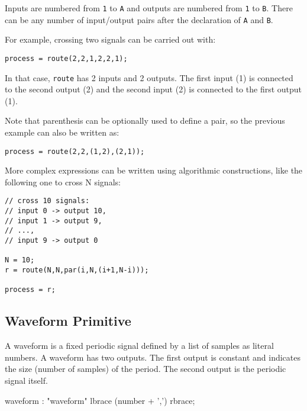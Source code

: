 Inputs are numbered from \lstinline'1' to \lstinline'A' and outputs are numbered from \lstinline'1' to \lstinline'B'. There can be any number of input/output pairs after the declaration of \lstinline'A' and \lstinline'B'.

For example, crossing two signals can be carried out with:

\begin{lstlisting}
process = route(2,2,1,2,2,1);
\end{lstlisting}

In that case, \lstinline'route' has 2 inputs and 2 outputs. The first input (1) is connected to the second output (2) and the second input (2) is connected to the first output (1).

Note that parenthesis can be optionally used to define a pair, so the previous example can also be written as:

\begin{lstlisting}
process = route(2,2,(1,2),(2,1));
\end{lstlisting}

More complex expressions can be written using algorithmic constructions, like the following one to cross N signals:

\begin{lstlisting}
// cross 10 signals: 
// input 0 -> output 10, 
// input 1 -> output 9, 
// ..., 
// input 9 -> output 0

N = 10;
r = route(N,N,par(i,N,(i+1,N-i)));

process = r;
\end{lstlisting}

\subsection{Waveform Primitive}

A waveform is a fixed periodic signal defined by a list of samples as literal numbers. A waveform has two outputs. The first output is constant and indicates the size (number of samples) of the period. The second output is the periodic signal itself. 

  \begin{rail}
  waveform : "waveform" lbrace (number + ',') rbrace;
  \end{rail}

